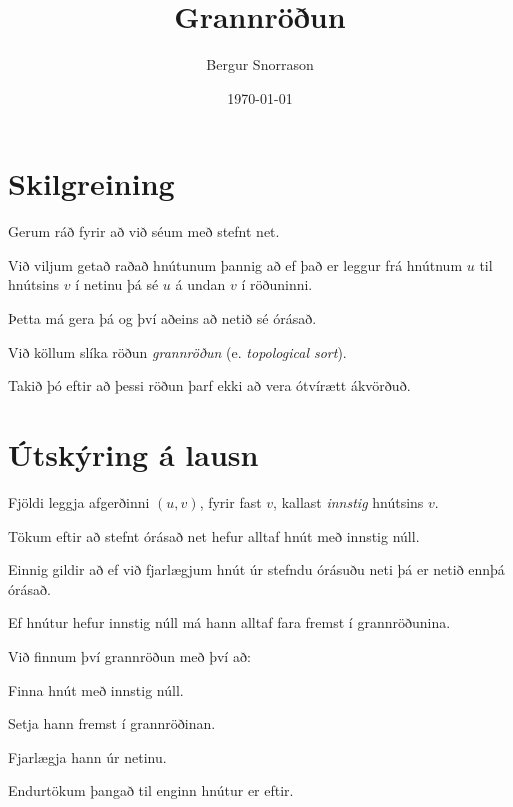 \title{Grannröðun}
\author{Bergur Snorrason}
\date{\today}



\frame{\titlepage}

\section{Skilgreining}
{
    {
        \item<1-> Gerum ráð fyrir að við séum með stefnt net.
        \item<2-> Við viljum getað raðað hnútunum þannig að ef það er leggur frá hnútnum $u$ til hnútsins $v$ í netinu þá sé $u$ á undan $v$ í röðuninni.
        \item<3-> Þetta má gera þá og því aðeins að netið sé órásað.
        \item<4-> Við köllum slíka röðun \emph{grannröðun} (e. \emph{topological sort}).
        \item<5-> Takið þó eftir að þessi röðun þarf ekki að vera ótvírætt ákvörðuð.
    }
}

\section{Útskýring á lausn}
{
    {
        \item<1-> Fjöldi leggja afgerðinni $(u, v)$, fyrir fast $v$, kallast \emph{innstig} hnútsins $v$.
        \item<2-> Tökum eftir að stefnt órásað net hefur alltaf hnút með innstig núll.
        \item<3-> Einnig gildir að ef við fjarlægjum hnút úr stefndu órásuðu neti þá er netið ennþá órásað.
        \item<4-> Ef hnútur hefur innstig núll má hann alltaf fara fremst í grannröðunina.
        \item<5-> Við finnum því grannröðun með því að:
        {
            \item<6-> Finna hnút með innstig núll.
            \item<7-> Setja hann fremst í grannröðinan.
            \item<8-> Fjarlægja hann úr netinu.
            \item<9-> Endurtökum þangað til enginn hnútur er eftir.
        }
    }
}

